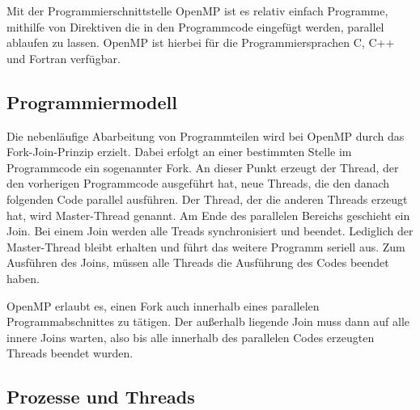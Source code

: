 \documentclass[../main.tex]{subfiles}
\begin{document}
Mit der Programmierschnittstelle OpenMP ist es relativ einfach Programme, mithilfe von Direktiven die in den Programmcode eingefügt werden, parallel ablaufen zu lassen. OpenMP ist hierbei für die Programmiersprachen C, C++ und Fortran verfügbar.

\subsection{Programmiermodell}

Die nebenläufige Abarbeitung von Programmteilen wird bei OpenMP durch das Fork-Join-Prinzip erzielt. Dabei erfolgt an einer bestimmten Stelle im Programmcode ein sogenannter Fork. An dieser Punkt erzeugt der Thread, der den vorherigen Programmcode ausgeführt hat, neue Threads, die den danach folgenden Code parallel ausführen. Der Thread, der die anderen Threads erzeugt hat, wird Master-Thread genannt. Am Ende des parallelen Bereichs geschieht ein Join. Bei einem Join werden alle Treads synchronisiert und beendet. Lediglich der Master-Thread bleibt erhalten und führt das weitere Programm seriell aus. Zum Ausführen des Joins, müssen alle Threads die Ausführung des Codes beendet haben.

OpenMP erlaubt es, einen Fork auch innerhalb eines parallelen Programmabschnittes zu tätigen. Der außerhalb liegende Join muss dann auf alle innere Joins warten, also bis alle innerhalb des parallelen Codes erzeugten Threads beendet wurden.

\subsection{Prozesse und Threads}
\end{document}
